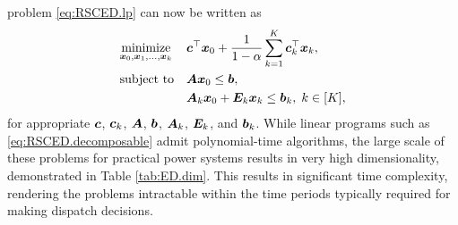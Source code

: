  problem \eqref{eq:RSCED.lp} can now be written as
%
\begin{equation}
\begin{aligned}
    &\underset{{\bm{x}}_0, {\bm{x}}_1, \dots, {\bm{x}}_k}{\text{minimize}} && {\bm{c}}^\top {\bm{x}}_0 + \frac{1}{1 - \alpha} \sum_{k = 1}^K {\bm{c}}_k^\top {\bm{x}}_k, \\
    &\text{subject to} && {\bm{A}} {\bm{x}}_0 \le {\bm{b}}, \\
    &&& {\bm{A}}_k {\bm{x}}_0 + {\bm{E}}_k {\bm{x}}_k \le {\bm{b}}_k, \; k\in[K],
\end{aligned}
\label{eq:RSCED.decomposable}
\end{equation}
for appropriate ${\bm{c}}$, ${\bm{c}}_k$, ${\bm{A}}$, ${\bm{b}}$, ${\bm{A}}_k$, ${\bm{E}}_k$, and ${\bm{b}}_k$.
While linear programs such as \eqref{eq:RSCED.decomposable} admit polynomial-time algorithms, the large scale of these problems for practical power systems results in very high dimensionality, demonstrated in Table \ref{tab:ED.dim}. This results in significant time complexity, rendering the problems intractable within the time periods typically required for making dispatch decisions. 


